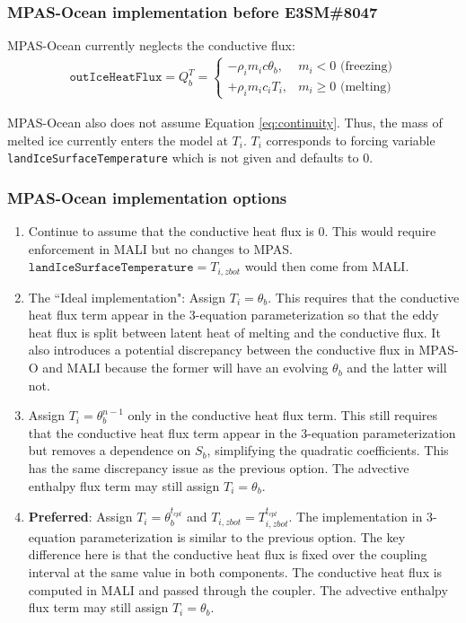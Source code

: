 \documentclass[11pt]{report}
\newcommand{\bea}{\begin{eqnarray}}
\newcommand{\eea}{\end{eqnarray}}
\begin{document}
\subsubsection{MPAS-Ocean implementation before E3SM\#8047}

MPAS-Ocean currently neglects the conductive flux:
\bea
    \texttt{outIceHeatFlux} = Q_b^T =     \begin{cases}
        -\rho_i m_i c \theta_b, &m_i < 0 \text{ (freezing)}\\
        +\rho_i m_i c_i T_i, &m_i \ge 0 \text{ (melting)}
    \end{cases}
\eea

MPAS-Ocean also does not assume Equation \ref{eq:continuity}. Thus, the mass of melted ice currently enters the model at $T_i$. $T_i$ corresponds to forcing variable \texttt{landIceSurfaceTemperature} which is not given and defaults to 0.

\subsubsection{MPAS-Ocean implementation options}

\begin{enumerate}
    \item Continue to assume that the conductive heat flux is 0. This would require enforcement in MALI but no changes to MPAS. $\texttt{landIceSurfaceTemperature} = T_{i,zbot}$ would then come from MALI.
    \item The ``Ideal implementation": Assign $T_i = \theta_b$. This requires that the conductive heat flux term appear in the 3-equation parameterization so that the eddy heat flux is split between latent heat of melting and the conductive flux. It also introduces a potential discrepancy between the conductive flux in MPAS-O and MALI because the former will have an evolving $\theta_b$ and the latter will not.
    \item Assign $T_i = \theta_b^{n-1}$ only in the conductive heat flux term. This still requires that the conductive heat flux term appear in the 3-equation parameterization but removes a dependence on $S_b$, simplifying the quadratic coefficients. This has the same discrepancy issue as the previous option. The advective enthalpy flux term may still assign $T_i = \theta_b$.
    \item \textbf{Preferred}: Assign $T_i = \theta_b^{t_{cpl}}$ and $T_{i,zbot}=T_{i,zbot}^{t_{cpl}}$. The implementation in 3-equation parameterization is similar to the previous option. The key difference here is that the conductive heat flux is fixed over the coupling interval at the same value in both components. The conductive heat flux is computed in MALI and passed through the coupler. The advective enthalpy flux term may still assign $T_i = \theta_b$.
\end{enumerate}
\end{document}
